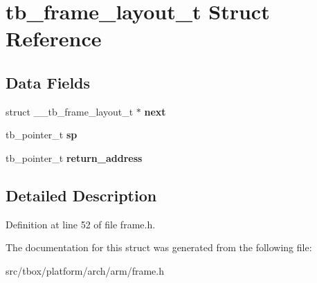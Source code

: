 \hypertarget{structtb__frame__layout__t}{\section{tb\-\_\-frame\-\_\-layout\-\_\-t Struct Reference}
\label{structtb__frame__layout__t}
}
\subsection*{Data Fields}
\begin{DoxyCompactItemize}
\item 
\hypertarget{structtb__frame__layout__t_a6ec504e20846b23dfda03857373b1636}{struct \-\_\-\-\_\-tb\-\_\-frame\-\_\-layout\-\_\-t $\ast$ {\bfseries next}}\label{structtb__frame__layout__t_a6ec504e20846b23dfda03857373b1636}

\item 
\hypertarget{structtb__frame__layout__t_a40974e5ba1544b8d967f7de2a7254ceb}{tb\-\_\-pointer\-\_\-t {\bfseries sp}}\label{structtb__frame__layout__t_a40974e5ba1544b8d967f7de2a7254ceb}

\item 
\hypertarget{structtb__frame__layout__t_a8c5095309284f6fcb9475c068151964e}{tb\-\_\-pointer\-\_\-t {\bfseries return\-\_\-address}}\label{structtb__frame__layout__t_a8c5095309284f6fcb9475c068151964e}

\end{DoxyCompactItemize}


\subsection{Detailed Description}


Definition at line 52 of file frame.\-h.



The documentation for this struct was generated from the following file\-:\begin{DoxyCompactItemize}
\item 
src/tbox/platform/arch/arm/frame.\-h\end{DoxyCompactItemize}
